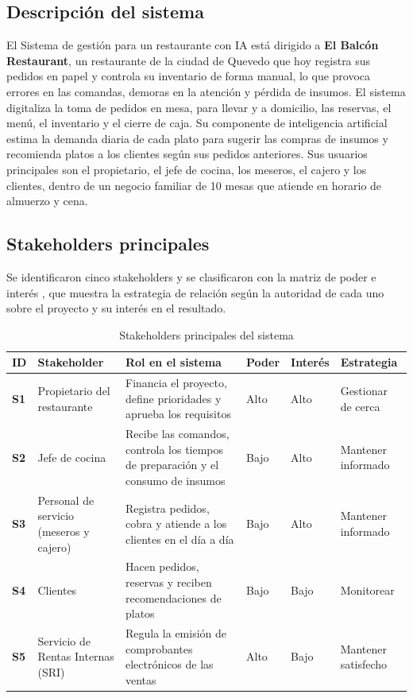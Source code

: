 \subsection{Descripción del sistema}
El Sistema de gestión para un restaurante con IA está dirigido a \textbf{El Balcón Restaurant}, un restaurante de la ciudad de Quevedo que hoy registra sus pedidos en papel y controla su inventario de forma manual, lo que provoca errores en las comandas, demoras en la atención y pérdida de insumos. El sistema digitaliza la toma de pedidos en mesa, para llevar y a domicilio, las reservas, el menú, el inventario y el cierre de caja. Su componente de inteligencia artificial estima la demanda diaria de cada plato para sugerir las compras de insumos y recomienda platos a los clientes según sus pedidos anteriores. Sus usuarios principales son el propietario, el jefe de cocina, los meseros, el cajero y los clientes, dentro de un negocio familiar de 10 mesas que atiende en horario de almuerzo y cena.

\subsection{Stakeholders principales}
Se identificaron cinco stakeholders y se clasificaron con la matriz de poder e interés \cite{pmbok7}, que muestra la estrategia de relación según la autoridad de cada uno sobre el proyecto y su interés en el resultado.

\begin{table}[H]
\centering\footnotesize
\caption{Stakeholders principales del sistema}\label{tab:stakeholders}
\begin{tabularx}{\textwidth}{@{}p{}p{}Yp{0.06\textwidth}p{0.07\textwidth}p{0.14\textwidth}@{}}
\toprule
\textbf{ID} & \textbf{Stakeholder} & \textbf{Rol en el sistema} & \textbf{Poder} & \textbf{Interés} & \textbf{Estrategia}\\
\midrule
\textbf{S1} & Propietario del restaurante & Financia el proyecto, define prioridades y aprueba los requisitos & Alto & Alto & Gestionar de cerca\\
\textbf{S2} & Jefe de cocina & Recibe las comandos, controla los tiempos de preparación y el consumo de insumos & Bajo & Alto & Mantener informado\\
\textbf{S3} & Personal de servicio (meseros y cajero) & Registra pedidos, cobra y atiende a los clientes en el día a día & Bajo & Alto & Mantener informado\\
\textbf{S4} & Clientes & Hacen pedidos, reservas y reciben recomendaciones de platos & Bajo & Bajo & Monitorear\\
\textbf{S5} & Servicio de Rentas Internas (SRI) & Regula la emisión de comprobantes electrónicos de las ventas & Alto & Bajo & Mantener satisfecho\\
\bottomrule
\end{tabularx}
\end{table}

